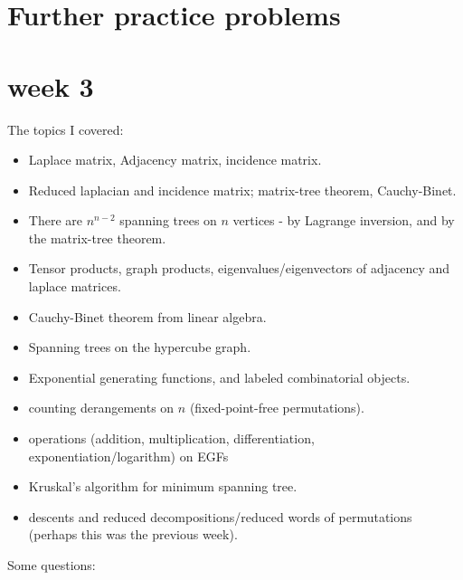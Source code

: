 \documentclass[12pt]{article}
\begin{document}
\section*{Further practice problems}

\section{week 3}

The topics I covered: 

\begin{itemize}
	\item Laplace matrix, Adjacency matrix, incidence matrix.
	\item Reduced laplacian and incidence matrix; matrix-tree theorem, Cauchy-Binet.
	\item There are $n^{n-2}$ spanning trees on $n$ vertices - by Lagrange inversion, and by the matrix-tree theorem.
	\item Tensor products, graph products, eigenvalues/eigenvectors of adjacency and laplace matrices.
	\item Cauchy-Binet theorem from linear algebra.
	\item Spanning trees on the hypercube graph.
	\item Exponential generating functions, and labeled combinatorial objects.
	\item counting derangements on $n$ (fixed-point-free permutations).
	\item operations (addition, multiplication, differentiation, exponentiation/logarithm) on EGFs
	\item Kruskal's algorithm for minimum spanning tree.
	\item descents and reduced decompositions/reduced words of permutations (perhaps this was the previous week).
\end{itemize}

Some questions:
\end{document}
